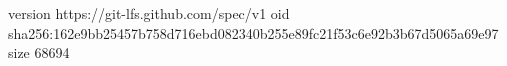 version https://git-lfs.github.com/spec/v1
oid sha256:162e9bb25457b758d716ebd082340b255e89fc21f53c6e92b3b67d5065a69e97
size 68694
